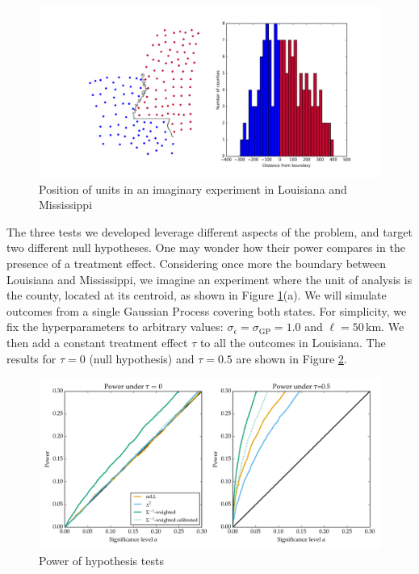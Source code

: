 \documentclass[letter]{article}
\makeatletter
\def\maxwidth{\ifdim\Gin@nat@width>\linewidth\linewidth
\else\Gin@nat@width\fi}
\let\Oldincludegraphics\includegraphics
\renewcommand{\includegraphics}[1]{\Oldincludegraphics[width=.8\maxwidth]{#1}}
\newcommand{\sigmaf}{\sigma_{\mathrm{GP}}}
\newcommand{\sigman}{\sigma_{\epsilon}}
\makeatother
\begin{document}
\begin{figure}
\centering
\includegraphics{figures/mississippi_counties.png}
\caption{\label{fig:mississippi_counties}Position of units in an imaginary experiment in Louisiana and Mississippi}
\end{figure}

The three tests we developed leverage different aspects of the problem, and target two different null hypotheses. One may wonder how their power compares in the presence of a treatment effect. Considering once more the boundary between Louisiana and Mississippi, we imagine an experiment where the unit of analysis is the county, located at its centroid, as shown in Figure \ref{fig:mississippi_counties}(a).
We will simulate outcomes from a single Gaussian Process covering both states. For simplicity, we fix the hyperparameters to arbitrary values: \(\sigman=\sigmaf=1.0\) and \(\ell=50\,\mathrm{km}\). We then add a constant treatment effect \(\tau\) to all the outcomes in Louisiana. The results for \(\tau=0\) (null hypothesis) and \(\tau=0.5\) are shown in Figure \ref{fig:power}.

\begin{figure}
\centering
\includegraphics{figures/power_HT.png}
\caption{\label{fig:power} Power of hypothesis tests}
\end{figure}
\end{document}
